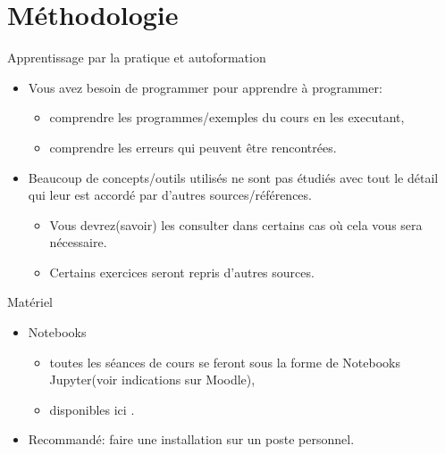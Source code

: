 \section{Méthodologie}
\frame{\sectionpage}

\begin{frame}[allowframebreaks]{Apprentissage par la pratique et autoformation}
    \begin{itemize}
        \item Vous avez besoin de programmer pour apprendre à programmer:
        \begin{itemize}
            \item comprendre les programmes/exemples du cours en les executant,
            \item comprendre les erreurs qui peuvent être rencontrées.
        \end{itemize}
        \item Beaucoup de concepts/outils utilisés ne sont pas étudiés avec tout le détail qui leur est accordé 
        par d'autres sources/références.
        \begin{itemize}
            \item Vous devrez(savoir) les consulter dans certains cas où cela vous sera nécessaire.
            \item Certains exercices seront repris d'autres sources.
        \end{itemize}
    \end{itemize}
\end{frame}

\begin{frame}[allowframebreaks]{Matériel}
    \begin{itemize}
        \item Notebooks
        \begin{itemize}
            \item toutes les séances de cours se feront sous la forme de Notebooks Jupyter(voir indications sur Moodle),
            \item disponibles ici \url{}.
        \end{itemize} 
        \item  Recommandé: faire une installation sur un poste personnel.
    \end{itemize}
\end{frame}


